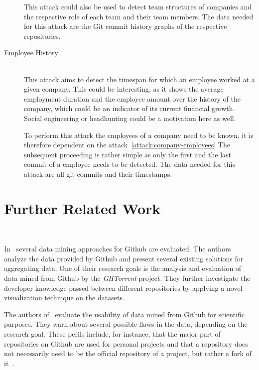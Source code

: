 \begin{description}
        This attack could also be used to detect team structures of companies and the respective role of each team and their team members.
        The data needed for this attack are the Git commit history graphs of the respective repositories.

    \item[Employee History] \hfill \\
        This attack aims to detect the timespan for which an employee worked at a given company.
        This could be interesting, as it shows the average employment duration and the employee amount over the history of the company, which could be an indicator of its current financial growth.
        Social engineering or headhunting could be a motivation here as well.

        To perform this attack the employees of a company need to be known, it is therefore dependent on the attack~\ref{attack:company-employees}
        The subsequent proceeding is rather simple as only the first and the last commit of a employee needs to be detected.
        The data needed for this attack are all git commits and their timestamps.

\end{description}


\section{Further Related Work}~\label{further-related-work}

In~\cite{git-mining} several data mining approaches for Github are evaluated.
The authors analyze the data provided by Github and present several existing solutions for aggregating data.
One of their research goals is the analysis and evaluation of data mined from Github by the \emph{GHTorrent} project.
They further investigate the developer knowledge passed between different repositories by applying a novel visualization technique on the datasets.

The authors of~\cite{inproceedings:promises-and-perils} evaluate the usability of data mined from Github for scientific purposes. They warn about several possible flaws in the data, depending on the research goal.
These perils include, for instance, that the major part of repositories on Github are used for personal projects and that a repository does not necessarily need to be the official repository of a project, but rather a fork of it~\cite[p.~4]{inproceedings:promises-and-perils}.
